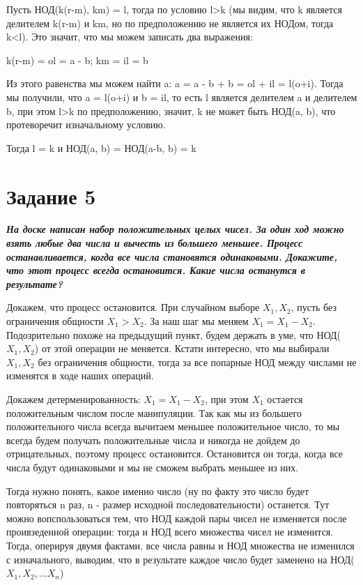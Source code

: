 \documentclass{article}
\begin{document}
Пусть НОД(k(r-m), km) = l, тогда по условию l>k (мы видим, что k является делителем k(r-m) и km, но по предположению не является их НОДом, тогда k<l). Это значит, что мы можем записать два выражения: 

k(r-m) = ol = a - b;  km = il = b

Из этого равенства мы можем найти a: a = a - b + b = ol + il = l(o+i). Тогда мы получили, что a = l(o+i) и b = il, то есть l является делителем a и делителем b, при этом l>k по предположению, значит, k не может быть НОД(a, b), что протеворечит изначальному условию.

Тогда l = k и НОД(a, b) = НОД(a-b, b) = k


\bigskip


\section*{\textbf{Задание 5}} \textbf{\textit{На доске написан набор положительных целых чисел. За один ход можно взять любые два числа и вычесть из большего меньшее. Процесс останавливается, когда все числа становятся одинаковыми. Докажите, что этот процесс всегда остановится. Какие числа останутся в результате?}}

Докажем, что процесс остановится. 
При случайном выборе $X_1, X_2$, пусть без ограничения общности $X_1 > X_2$. За наш шаг мы меняем $X_1 = X_1 - X_2$. Подозрительно похоже на предыдущий пункт, будем держать в уме, что НОД($X_1, X_2$) от этой операции не меняется. Кстати интересно, что мы выбирали $X_1, X_2$ без ограничения общности, тогда за все попарные НОД между числами не изменятся в ходе наших операций. 

Докажем детерменированность: $X_1 = X_1 - X_2$, при этом $X_1$ остается положительным числом после манипуляции. Так как мы из большего положительного числа всегда вычитаем меньшее положительное число, то мы всегда будем получать положительные числа и никогда не дойдем до отрицательных, поэтому процесс остановится. Остановится он тогда, когда все числа будут одинаковыми и мы не сможем выбрать меньшее из них.

Тогда нужно понять, какое именно число (ну по факту это число будет повторяться n раз, n - размер исходной последовательности) останется. Тут можно вопспользоваться тем, что НОД каждой пары чисел не изменяется после проивзеденной операции: тогда и НОД всего множества чисел не изменится. Тогда, оперируя двумя фактами, все числа равны и НОД множества не изменился с изначального, выводим, что в результате каждое число будет заменено на НОД($X_1, X_2, ... X_n$)
\end{document}

